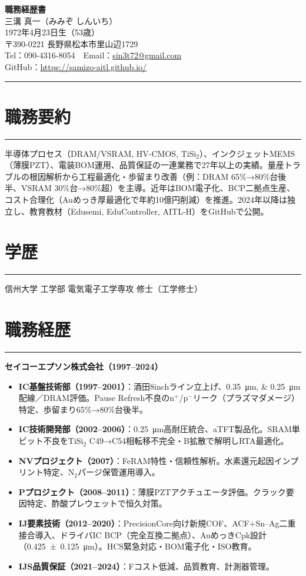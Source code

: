 \documentclass[11pt]{bxjsarticle}
\newcommand{\cvsection}[1]{\section*{#1}\vspace{-0.3em}\hrule\vspace{0.5em}}
\begin{document}
\begin{center}
{\Huge \textbf{職務経歴書}} \\[1.2em]
{\Large 三溝 真一（みみぞ しんいち）} \\[0.5em]
1972年4月23日生（53歳） \\[0.3em]
〒390-0221 長野県松本市里山辺1729 \\[0.3em]
Tel：090-4316-8054　Email：\href{mailto:sin3t72@gmail.com}{sin3t72@gmail.com} \\[0.3em]
GitHub：\href{https://samizo-aitl.github.io/}{https://samizo-aitl.github.io/}
\end{center}

\vspace{1em}
\hrule
\vspace{1em}

\cvsection{職務要約}
半導体プロセス（DRAM/VSRAM, HV-CMOS, TiSi$_2$）、インクジェットMEMS（薄膜PZT）、電装BOM運用、品質保証の一連業務で27年以上の実績。量産トラブルの根因解析から工程最適化・歩留まり改善（例：DRAM 65\%→80\%台後半、VSRAM 30\%台→80\%超）を主導。近年はBOM電子化、BCP二拠点生産、コスト合理化（Auめっき厚最適化で年約10億円削減）を推進。2024年以降は独立し、教育教材（Edusemi, EduController, AITL-H）をGitHubで公開。

\cvsection{学歴}
信州大学 工学部 電気電子工学専攻 修士（工学修士）

\cvsection{職務経歴}
\textbf{セイコーエプソン株式会社（1997–2024）}

\begin{itemize}
  \item \textbf{IC基盤技術部（1997–2001）}：酒田8inchライン立上げ、\SIlist{0.35;0.25}{\micro\metre}配線／DRAM評価。Pause Refresh不良のn$^+$/p$^-$リーク（プラズマダメージ）特定、歩留まり65\%→80\%台後半。
  \item \textbf{IC技術開発部（2002–2006）}：\SI{0.25}{\micro\metre}高耐圧統合、aTFT製品化。SRAM単ビット不良をTiSi$_2$ C49→C54相転移不完全・B拡散で解明しRTA最適化。
  \item \textbf{NVプロジェクト（2007）}：FeRAM特性・信頼性解析。水素還元起因インプリント特定、N$_2$パージ保管運用導入。
  \item \textbf{Pプロジェクト（2008–2011）}：薄膜PZTアクチュエータ評価。クラック要因特定、酢酸プレウェットで恒久対策。
  \item \textbf{IJ要素技術（2012–2020）}：PrecisionCore向け新規COF、ACF+Sn–Ag二重接合導入、ドライバIC BCP（完全互換二拠点）、AuめっきCpk設計（\SI{0.425 \pm 0.125}{\micro\metre}）。HCS緊急対応・BOM電子化・ISO教育。
  \item \textbf{IJS品質保証（2021–2024）}：Fコスト低減、品質教育、計測器管理。
\end{itemize}
\end{document}
